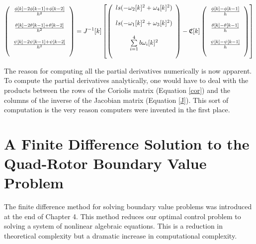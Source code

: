 \begin{equation}
    \left(
        \begin{array}{c}
           \frac{\phi[k] -2 \phi[k-1] + \phi[k-2]}{h^2}\\\\
           \frac{\theta[k] -2 \theta[k-1] + \theta[k-2]}{h^2}\\\\
           \frac{\psi[k] -2 \psi[k-1] + \psi[k-2]}{h^2}\\\\
        \end{array}
    \right) = J^{-1}[k]
    \left[ \left(
        \begin{array}{c}
            l s (-\omega_2[k]^2 + \omega_4[k]^2)\\\\
            l s (-\omega_1[k]^2 + \omega_3[k]^2)\\\\
            \sum \limits_{i=1}^4 b \omega_i[k]^2\\\\
        \end{array}
    \right) -
    \mathfrak{C}[k]
    \left(
        \begin{array}{c}
           \frac{\phi[k] - \phi[k-1]}{h} \\\\
           \frac{\theta[k] - \theta[k-1]}{h} \\\\
           \frac{\psi[k] - \psi[k-1]}{h} \\\\
        \end{array}
    \right)
    \right]
\end{equation}

The reason for computing all the partial derivatives numerically is now apparent. To compute the partial derivatives analytically, one would have to deal with the products between the rows of the Coriolis matrix (Equation \ref{cor}) and the columns of the inverse of the Jacobian matrix (Equation \ref{J}). This sort of computation is the very reason computers were invented in the first place.

\section{A Finite Difference Solution to the Quad-Rotor Boundary Value Problem}

The finite difference method for solving boundary value problems was introduced at the end of Chapter 4. This method reduces our optimal control problem to solving a system of nonlinear algebraic equations. This is a reduction in theoretical complexity but a dramatic increase in computational complexity.

